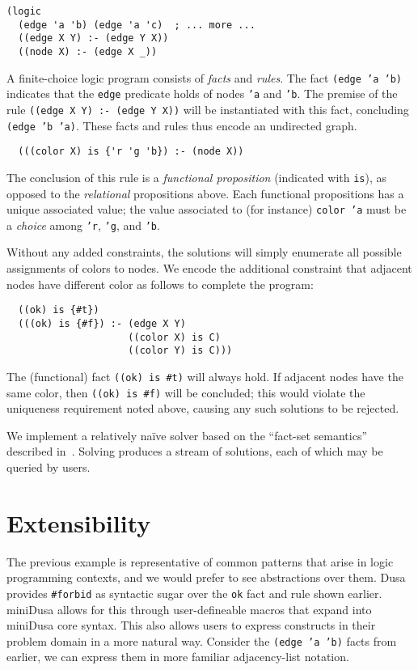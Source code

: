 \documentclass[dvipsnames,sigplan,screen,review,anonymous,acmthm,nonacm]{acmart}
\begin{document}
\begin{verbatim}
(logic
  (edge 'a 'b) (edge 'a 'c)  ; ... more ...
  ((edge X Y) :- (edge Y X))
  ((node X) :- (edge X _))
\end{verbatim}
A finite-choice logic program consists of \emph{facts} and \emph{rules}.
The fact \texttt{(edge 'a 'b)} indicates that the \texttt{edge} predicate
holds of nodes \texttt{'a} and \texttt{'b}.
The premise of the rule \texttt{((edge X Y) :- (edge Y X))} will be
instantiated with this fact, concluding \texttt{(edge 'b 'a)}.
These facts and rules thus encode an undirected graph.

\begin{verbatim}
  (((color X) is {'r 'g 'b}) :- (node X))
\end{verbatim}
The conclusion of this rule is a \emph{functional proposition}
(indicated with \texttt{is}), as opposed to the \emph{relational} propositions above.
Each functional propositions has a unique associated value;
the value associated to (for instance) \texttt{color 'a} must
be a \emph{choice} among \texttt{'r}, \texttt{'g}, and \texttt{'b}.

Without any added constraints, the solutions will simply enumerate all
possible assignments of colors to nodes. We encode the additional constraint
that adjacent nodes have different color as follows to complete the program:

\begin{verbatim}
  ((ok) is {#t})
  (((ok) is {#f}) :- (edge X Y)
                     ((color X) is C)
                     ((color Y) is C)))
\end{verbatim}
The (functional) fact \texttt{((ok) is {\#t})} will always hold.
If adjacent nodes have the same color, then \texttt{((ok) is {\#f})}
will be concluded; this would violate the uniqueness requirement noted
above, causing any such solutions to be rejected.

We implement a relatively naïve solver based on the ``fact-set semantics''
described in~\cite{martens2025dusa}. Solving produces a stream of solutions,
each of which may be queried by users.

\section{Extensibility}

The previous example is representative of common patterns that arise in logic
programming contexts, and we would prefer to see abstractions over them. Dusa
provides \texttt{\#forbid} as syntactic sugar over the \texttt{ok} fact and rule
shown earlier. miniDusa allows for this through user-defineable macros that
expand into miniDusa core syntax. This also allows users to express constructs
in their problem domain in a more natural way. Consider the
\texttt{(edge 'a 'b)} facts from earlier, we can express them in more familiar
adjacency-list notation.
\end{document}
